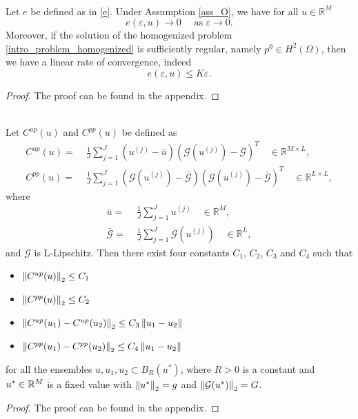 \documentclass[10pt]{article}
\begin{document}
\begin{lemma}
\label{f_goes_to_0}
\leavevmode \\
Let $e$ be defined as in \eqref{e}. Under Assumption \ref{ass_O}, we have for all $u \in \mathbb{R}^M$
\[ e(\varepsilon, u) \to 0 \quad \text{ as } \varepsilon \to 0. \]
Moreover, if the solution of the homogenized problem \eqref{intro_problem_homogenized} is sufficiently regular, namely $p^0 \in H^2(\Omega)$, then we have a linear rate of convergence, indeed
\[ e(\varepsilon, u) \le K \varepsilon. \]
\end{lemma}
\begin{proof}
The proof can be found in the appendix.
\end{proof}

\begin{lemma}
\label{covariance_bound}
\leavevmode \\
Let $C^{up}(u)$ and $C^{pp}(u)$ be defined as
\begin{align*}
C^{up}(u) = & \; \frac{1}{J} \sum_{j=1}^J (u^{(j)} - \bar{u}) (\mathcal{G}(u^{(j)}) - \bar{\mathcal{G}})^T \quad \in \mathbb{R}^{M \times L}, \\
C^{pp}(u) = & \; \frac{1}{J} \sum_{j=1}^J (\mathcal{G}(u^{(j)}) - \bar{\mathcal{G}}) (\mathcal{G}(u^{(j)}) - \bar{\mathcal{G}})^T \quad \in \mathbb{R}^{L \times L},
\end{align*}
where
\begin{align*}
\bar{u} = & \; \frac{1}{J} \sum_{j=1}^J u^{(j)} \quad \in \mathbb{R}^M, \\
\bar{\mathcal{G}} = & \; \frac{1}{J} \sum_{j=1}^J \mathcal{G}(u^{(j)}) \quad \in \mathbb{R}^L,
\end{align*}
and $\mathcal{G}$ is L-Lipschitz. Then there exist four constants $C_1$, $C_2$, $C_3$ and $C_4$ such that
\begin{itemize}
\item $\left\|C^{up}(u)\right\|_2 \le C_1$
\item $\left\|C^{pp}(u)\right\|_2 \le C_2$
\item $\left\|C^{up}(u_1) - C^{up}(u_2)\right\|_2 \le C_3 \left\|u_1 - u_2\right\|$
\item $\left\|C^{pp}(u_1) - C^{pp}(u_2)\right\|_2 \le C_4 \left\|u_1 - u_2\right\|$
\end{itemize}
for all the ensembles $u, u_1, u_2 \subset B_R(u^*)$, where $R > 0$ is a constant and $u^* \in \mathbb{R}^M$ is a fixed value with $\left\|u^*\right\|_2 = g$ and $\left\|\mathcal{G}(u^*)\right\|_2 = G$.
\end{lemma}
\begin{proof}
The proof can be found in the appendix.
\end{proof}
\end{document}
